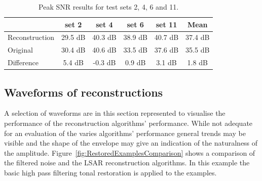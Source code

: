 \begin{table}\begin{center}
\caption{Peak SNR results for test sets 2, 4, 6 and 11.}
\label{tab:PeakSNR}
\begin{tabular}{|l|c|c|c|c|c|}\hline
                    & set 2     & set 4     & set 6     & set 11    & Mean      \\ \hline
  Reconstruction    & 29.5 dB   & 40.3 dB   & 38.9 dB   & 40.7 dB   & 37.4 dB   \\
  Original          & 30.4 dB   & 40.6 dB   & 33.5 dB   & 37.6 dB   & 35.5 dB   \\ \hline
  Difference        & 5.4 dB    & -0.3 dB   & 0.9  dB   & 3.1  dB   & 1.8  dB   \\
  \hline
\end{tabular}\end{center}\end{table}

\subsection{Waveforms of reconstructions}
A selection of waveforms are in this section represented to visualise the performance of the reconstruction algorithms' performance. While not adequate for an evaluation of the varies algorithms' performance general trends may be visible and the shape of the envelope may give an indication of the naturalness of the amplitude. Figure~\ref{fig:RestoredExamplesComparison} shows a comparison of the filtered noise and the LSAR reconstruction algorithms. In this example the basic high pass filtering tonal restoration is applied to the examples.

